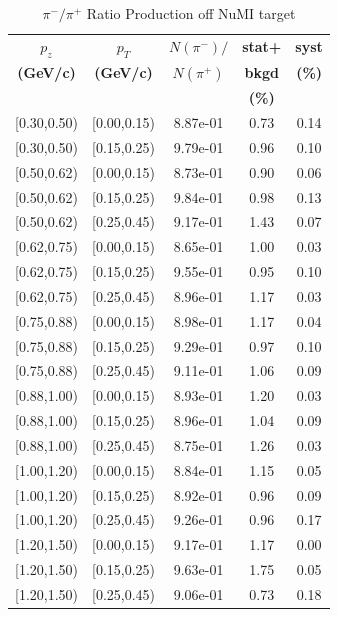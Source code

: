\documentclass[%
aps, prd, reprint, show pacs, preprint numbers, ams math, amssymb, superscriptaddress, linenumbers]{revtex4-1}
\begin{document}
\begin{table}
\caption{$\pi^-/\pi^+$ Ratio Production off NuMI target}
\begin{tabular}{|c|c|c|c|c|}
\hline

\textbf{$p_z$} & \textbf{$p_T$} & \textbf{$N(\pi^-)/$} & \textbf{stat+} & \textbf{syst}\\
\textbf{(GeV/c)} &\textbf{(GeV/c)} & \textbf{$N(\pi^+)$}& \textbf{bkgd}& \textbf{(\%)}\\
& & & \textbf{(\%)} & \\

[0.30,0.50) & [0.00,0.15) & 8.87e-01 & 0.73 & 0.14 \\ 
 \hline
[0.30,0.50) & [0.15,0.25) & 9.79e-01 & 0.96 & 0.10 \\ 
 \hline
[0.50,0.62) & [0.00,0.15) & 8.73e-01 & 0.90 & 0.06 \\ 
 \hline
[0.50,0.62) & [0.15,0.25) & 9.84e-01 & 0.98 & 0.13 \\ 
 \hline
[0.50,0.62) & [0.25,0.45) & 9.17e-01 & 1.43 & 0.07 \\ 
 \hline
[0.62,0.75) & [0.00,0.15) & 8.65e-01 & 1.00 & 0.03 \\ 
 \hline
[0.62,0.75) & [0.15,0.25) & 9.55e-01 & 0.95 & 0.10 \\ 
 \hline
[0.62,0.75) & [0.25,0.45) & 8.96e-01 & 1.17 & 0.03 \\ 
 \hline
[0.75,0.88) & [0.00,0.15) & 8.98e-01 & 1.17 & 0.04 \\ 
 \hline
[0.75,0.88) & [0.15,0.25) & 9.29e-01 & 0.97 & 0.10 \\ 
 \hline
[0.75,0.88) & [0.25,0.45) & 9.11e-01 & 1.06 & 0.09 \\ 
 \hline
[0.88,1.00) & [0.00,0.15) & 8.93e-01 & 1.20 & 0.03 \\ 
 \hline
[0.88,1.00) & [0.15,0.25) & 8.96e-01 & 1.04 & 0.09 \\ 
 \hline
[0.88,1.00) & [0.25,0.45) & 8.75e-01 & 1.26 & 0.03 \\ 
 \hline
[1.00,1.20) & [0.00,0.15) & 8.84e-01 & 1.15 & 0.05 \\ 
 \hline
[1.00,1.20) & [0.15,0.25) & 8.92e-01 & 0.96 & 0.09 \\ 
 \hline
[1.00,1.20) & [0.25,0.45) & 9.26e-01 & 0.96 & 0.17 \\ 
 \hline
[1.20,1.50) & [0.00,0.15) & 9.17e-01 & 1.17 & 0.00 \\ 
 \hline
[1.20,1.50) & [0.15,0.25) & 9.63e-01 & 1.75 & 0.05 \\ 
 \hline
[1.20,1.50) & [0.25,0.45) & 9.06e-01 & 0.73 & 0.18 \\ 

\end{tabular}
\end{table}
\end{document}
